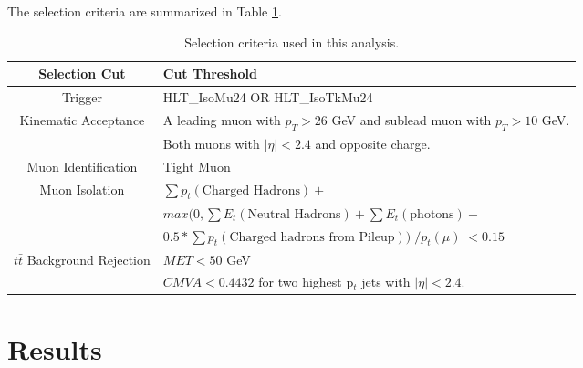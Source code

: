 \documentclass[
10pt, %
a4paper, %
oneside, %
headinclude,footinclude, %
BCOR5mm, %
]{scrartcl}
\begin{document}
The selection criteria are summarized in Table \ref{tab:cuts}. \\


\begin{table}[htp]
    \centering
    \label{tab:cuts}

 \caption{ Selection criteria used in this analysis.}
\begin{adjustbox}{width=1\textwidth}
\begin{tabular}{|| c | l ||}
    \hline
    \textbf{Selection Cut}  & \textbf{Cut Threshold}\\
 \hline \hline
 Trigger & HLT\_IsoMu24 OR HLT\_IsoTkMu24 \\

 \hline

 Kinematic Acceptance & A leading muon with $p_T > 26 $ GeV and sublead muon with $p_T > 10 $ GeV.\\
                      & Both muons with $|\eta| < 2.4$ and opposite charge. \\
  \hline
  Muon Identification & Tight Muon \\

  \hline

  Muon Isolation & $\sum p_t (\text{Charged Hadrons}) +$  \\
                 & $max(0, \sum E_t (\text{Neutral Hadrons}) + \sum E_t (\text{photons}) - $ \\ 
                 &  $0.5 * \sum p_t (\text{Charged hadrons from Pileup}))\; /p_t (\mu) \; < 0.15$ \\

  \hline

  $t\bar{t}$ Background Rejection & $MET < 50$ GeV \\
                                  & $CMVA < 0.4432$ for two highest p$_t$ jets with $|\eta| < 2.4$.  \\




 \hline

 \end{tabular}
 \end{adjustbox}

\end{table}


\section{Results}
\end{document}
